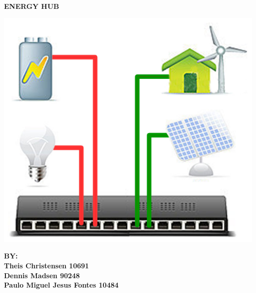 
\begin{centering}
\thispagestyle{empty} %

\begin{center}
\textbf{\Huge {ENERGY HUB}\\ \vspace{1cm}}
\end{center}

\centering
\includegraphics[width=1.0\textwidth]{images/frontpage.jpg}
 \end{centering}

\begin{center}
\Large{\textbf{BY: \\Theis Christensen 10691 \\Dennis Madsen 90248\\Paulo Miguel Jesus Fontes 10484}}
\end{center}